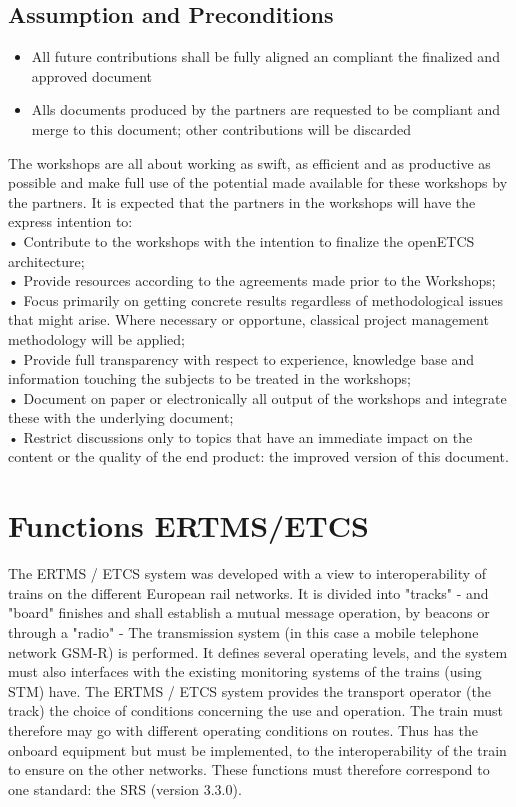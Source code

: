 \documentclass{template/openetcs_report}
\begin{document}
\subsection{Assumption and Preconditions}
\begin{itemize}
\item All future contributions shall be fully aligned an compliant the finalized and approved document 
\item Alls documents produced by the partners are requested to be compliant and merge to this document; other contributions will be discarded
\end{itemize}
The workshops are all about working as swift, as efficient and as productive as possible and make full use of the potential made available for these workshops by the partners. It is expected that the partners in the workshops will have the express intention to:\\
•	Contribute to the workshops with the intention to finalize the openETCS architecture;\\
•	Provide resources according to the agreements made prior to the Workshops;\\
•	Focus primarily on  getting concrete results regardless of methodological issues that might arise. Where necessary or opportune, classical project management methodology will be applied;\\
•	Provide full transparency with respect to experience, knowledge base and information touching the subjects to be treated in the workshops;\\
•	Document on paper or electronically all output of the workshops and integrate these with the underlying document;\\
•	Restrict discussions only to topics that have an immediate impact on the content or the quality of the end product: the improved version of this document.\\


\section{Functions ERTMS/ETCS}
The ERTMS / ETCS system was developed with a view to interoperability of trains on the 
different European rail networks. It is divided into "tracks" - and "board" finishes 
and shall establish a mutual message operation, by beacons or through a "radio" - 
The transmission system (in this case a mobile telephone network GSM-R) is performed. 
It defines several operating levels, and the system must also interfaces with the 
existing monitoring systems of the trains (using STM) have. 
The ERTMS / ETCS system provides the transport operator (the track) the choice of conditions 
concerning the use and operation. 
The train must therefore may go with different operating conditions on routes. 
Thus has the onboard equipment but must be implemented, 
to the interoperability of the train to ensure on the other networks. 
These functions must therefore correspond to one standard: the SRS (version 3.3.0). 
\end{document}
